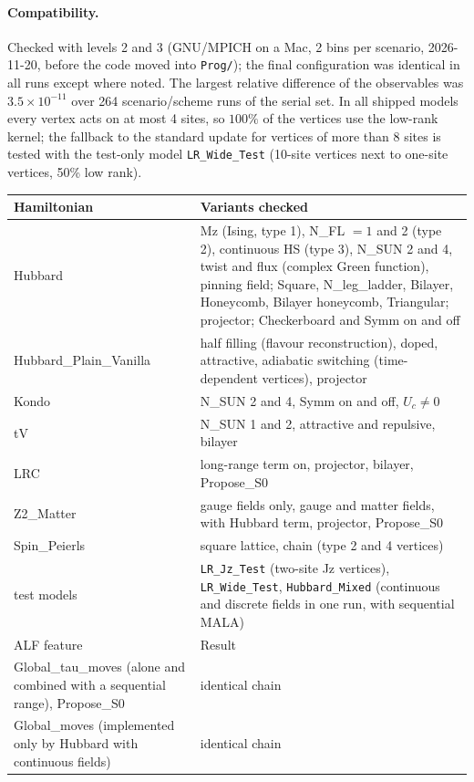 \paragraph{Compatibility.}
Checked with levels 2 and 3 (GNU/MPICH on a Mac, 2 bins per scenario, 2026-11-20, before the code moved into
\texttt{Prog/}); the final configuration was
identical in all runs except where noted. The largest relative difference of the observables was
$3.5\times10^{-11}$ over 264 scenario/scheme runs of the serial set. In all shipped models every vertex acts on at most
4 sites, so $100\%$ of the vertices use the low-rank kernel; the fallback to the standard update for vertices of more than
8 sites is tested with the test-only model \texttt{LR\_Wide\_Test} (10-site vertices next to one-site vertices, 50\% low rank).
\begin{center}\small
\begin{tabular}{p{}p{}}
\hline
Hamiltonian & Variants checked \\
\hline
Hubbard & Mz (Ising, type 1), N\_FL $=1$ and 2 (type 2), continuous HS (type 3), N\_SUN 2 and 4, twist and flux
(complex Green function), pinning field; Square, N\_leg\_ladder, Bilayer, Honeycomb, Bilayer honeycomb,
Triangular; projector; Checkerboard and Symm on and off \\
Hubbard\_Plain\_Vanilla & half filling (flavour reconstruction), doped, attractive, adiabatic switching
(time-dependent vertices), projector \\
Kondo & N\_SUN 2 and 4, Symm on and off, $U_c \ne 0$ \\
tV & N\_SUN 1 and 2, attractive and repulsive, bilayer \\
LRC & long-range term on, projector, bilayer, Propose\_S0 \\
Z2\_Matter & gauge fields only, gauge and matter fields, with Hubbard term, projector, Propose\_S0 \\
Spin\_Peierls & square lattice, chain (type 2 and 4 vertices) \\
test models & \texttt{LR\_Jz\_Test} (two-site Jz vertices), \texttt{LR\_Wide\_Test}, \texttt{Hubbard\_Mixed}
(continuous and discrete fields in one run, with sequential MALA) \\
\hline
ALF feature & Result \\
\hline
Global\_tau\_moves (alone and combined with a sequential range), Propose\_S0 & identical chain \\
Global\_moves (implemented only by Hubbard with continuous fields) & identical chain \\

\end{tabular}
\end{center}
